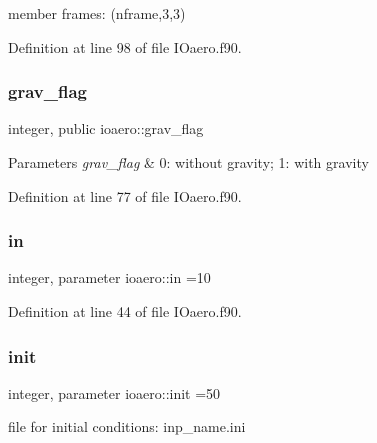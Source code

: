 member frames\+: (nframe,3,3) 



Definition at line 98 of file I\+Oaero.\+f90.

\mbox{\label{namespaceioaero_a831fe87d45ef05e3e29a8c4c2fc88c8f}} 
\subsubsection{\texorpdfstring{grav\+\_\+flag}{grav\_flag}}
{\footnotesize\ttfamily integer, public ioaero\+::grav\+\_\+flag}


\begin{DoxyParams}{Parameters}
{\em grav\+\_\+flag} & 0\+: without gravity; 1\+: with gravity \\
\hline
\end{DoxyParams}


Definition at line 77 of file I\+Oaero.\+f90.

\mbox{\label{namespaceioaero_a09d53f15b1a2c723ad2b4df01c16bccc}} 
\subsubsection{\texorpdfstring{in}{in}}
{\footnotesize\ttfamily integer, parameter ioaero\+::in =10\hspace{0.3cm}{\ttfamily [private]}}



Definition at line 44 of file I\+Oaero.\+f90.

\mbox{\label{namespaceioaero_afb3050696f2887599d4083672103b6e7}} 
\subsubsection{\texorpdfstring{init}{init}}
{\footnotesize\ttfamily integer, parameter ioaero\+::init =50\hspace{0.3cm}{\ttfamily [private]}}



file for initial conditions\+: inp\+\_\+name.\+ini 



